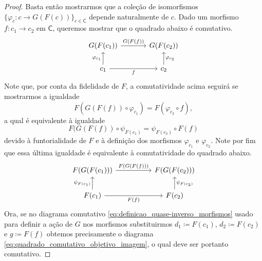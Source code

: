 \begin{proof}
  Basta então mostrarmos que a coleção de isomorfismos $\{\varphi_{c}: c \to G(F(c))\}_{c \in \mathsf{C}}$ depende naturalmente de $c$.
  Dado um morfismo $f: c_{1} \to c_{2}$ em $\mathsf{C}$, queremos mostrar que o quadrado abaixo é comutativo.
  \begin{equation}
    \label{eq:quadrado_comutativo_objetivo}
    \begin{tikzcd}[column sep=1.25cm]
      G(F(c_{1}))
      \arrow[r, "G(F(f))"]
      & G(F(c_{2}))
      \\ c_{1}
      \arrow[u, "\varphi_{c_{1}}"]
      \arrow[r, "f" swap]
      & c_{2}
      \arrow[u, "\varphi_{c_{2}}" swap]
    \end{tikzcd}
  \end{equation}
  Note que, por conta da fidelidade de $F$, a comutatividade acima seguirá se mostrarmos a igualdade
  \begin{displaymath}
    F(G(F(f)) \circ \varphi_{c_{1}}) = F(\varphi_{c_{2}} \circ f),
  \end{displaymath}
  a qual é equivalente à igualdade
  \begin{displaymath}
    F(G(F(f)) \circ \psi_{F(c_{1})} = \psi_{F(c_{2})} \circ F(f)
  \end{displaymath}
  devido à funtorialidade de $F$ e à definição dos morfismos $\varphi_{c_{1}}$ e $\varphi_{c_{2}}$.
  Note por fim que essa última igualdade é equivalente à comutatividade do quadrado abaixo.
  \begin{equation}\label{eq:quadrado_comutativo_objetivo_imagem}
    \begin{tikzcd}[column sep=1.75cm]
      F(G(F(c_{1})))
      \arrow[r, "F(G(F(f)))"]
      & F(G(F(c_{2})))
      \\ F(c_{1})
      \arrow[r, "F(f)" swap]
      \arrow[u, "\psi_{F(c_{1})}"]
      & F(c_{2})
      \arrow[u, "\psi_{F(c_{2})}" swap]
    \end{tikzcd}
  \end{equation}
  Ora, se no diagrama comutativo \eqref{eq:definicao_quase-inverso_morfismos} usado para definir a ação de $G$ nos morfismos substituirmos $d_{1} \coloneqq F(c_{1})$, $d_{2} \coloneqq F(c_{2})$ e $g \coloneqq F(f)$ obtemos precisamente o diagrama \eqref{eq:quadrado_comutativo_objetivo_imagem}, o qual deve ser portanto comutativo.
\end{proof}



